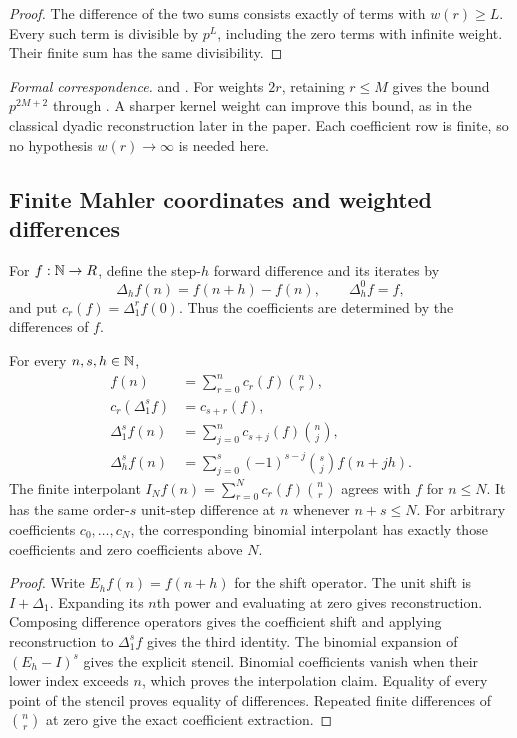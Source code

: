 \begin{proof}
The difference of the two sums consists exactly of terms with $w(r)\geq L$.
Every such term is divisible by $p^L$, including the zero terms with infinite
weight. Their finite sum has the same divisibility.
\end{proof}

\begingroup\small\raggedright
\noindent\emph{Formal correspondence.}
 and
.
For weights $2r$, retaining $r\leq M$ gives the bound $p^{2M+2}$ through
. A sharper kernel weight can improve this
bound, as in the classical dyadic reconstruction later in the paper. Each
coefficient row is finite, so no hypothesis $w(r)\to\infty$ is needed here.
\par\endgroup

\subsection{Finite Mahler coordinates and weighted differences}

For $f:\mathbb N\to R$, define the step-$h$ forward difference and its iterates by
\[
\Delta_h f(n)=f(n+h)-f(n),\qquad \Delta_h^0 f=f,
\]
and put $c_r(f)=\Delta_1^r f(0)$. Thus the coefficients are determined by the
differences of $f$.

\begin{theorem}
\label{thm:mahler-foundation}
For every $n,s,h\in\mathbb N$,
\[
\begin{aligned}
f(n)&=\sum_{r=0}^{n}c_r(f)\binom nr,\\
c_r(\Delta_1^s f)&=c_{s+r}(f),\\
\Delta_1^s f(n)&=\sum_{j=0}^{n}c_{s+j}(f)\binom nj,\\
\Delta_h^s f(n)&=\sum_{j=0}^{s}(-1)^{s-j}\binom sj f(n+jh).
\end{aligned}
\]
The finite interpolant
$I_Nf(n)=\sum_{r=0}^{N}c_r(f)\binom nr$ agrees with $f$ for $n\leq N$.
It has the same order-$s$ unit-step difference at $n$ whenever $n+s\leq N$.
For arbitrary coefficients $c_0,\ldots,c_N$, the corresponding binomial
interpolant has exactly those coefficients and zero coefficients above $N$.
\end{theorem}

\begin{proof}
Write $E_h f(n)=f(n+h)$ for the shift operator. The unit shift is
$I+\Delta_1$. Expanding its $n$th power and evaluating
at zero gives reconstruction. Composing difference operators gives the
coefficient shift and applying reconstruction to $\Delta_1^s f$ gives the
third identity. The binomial expansion of $(E_h-I)^s$ gives the explicit
stencil. Binomial coefficients vanish when their lower index exceeds $n$,
which proves the interpolation claim. Equality of every point of the stencil
proves equality of differences. Repeated finite differences of $\binom nr$
at zero give the exact coefficient extraction.
\end{proof}

